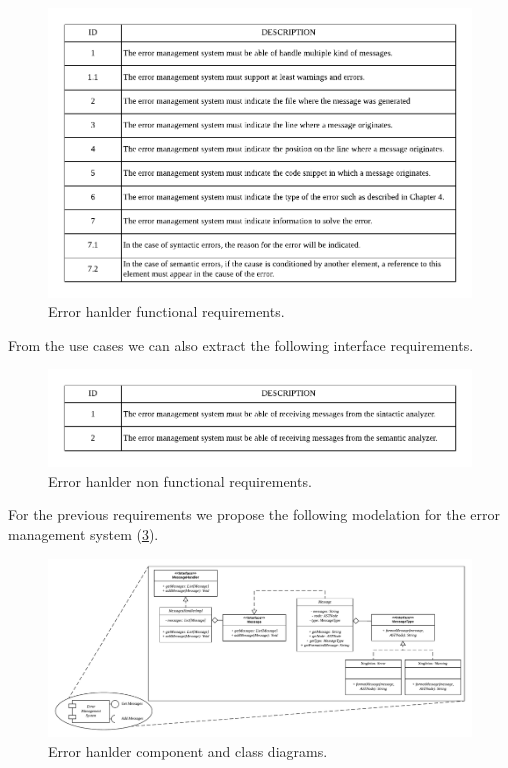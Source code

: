 \begin{figure}[h!]
    \includegraphics[width=\textwidth]{images/err-hand-reqf.pdf}
    \centering
    \caption[Error hanlder functional requirements]{Error hanlder functional requirements.}
    \label{fig:err-hand-reqf}
\end{figure}

From the use cases we can also extract the following interface requirements.

\begin{figure}[h!]
    \includegraphics[width=\textwidth]{images/err-hand-reqnf.pdf}
    \centering
    \caption[Error hanlder non functional requirements]{Error hanlder non functional requirements.}
    \label{fig:err-hand-reqnf}
\end{figure}

For the previous requirements we propose the following modelation for the error management system (\cref{fig:err-hand-diag}).

\begin{figure}[h!]
    \includegraphics[width=\textwidth]{images/err-hand-diagram.pdf}
    \centering
    \caption[Error hanlder component and class diagrams]{Error hanlder component and class diagrams.}
    \label{fig:err-hand-diag}
\end{figure}


